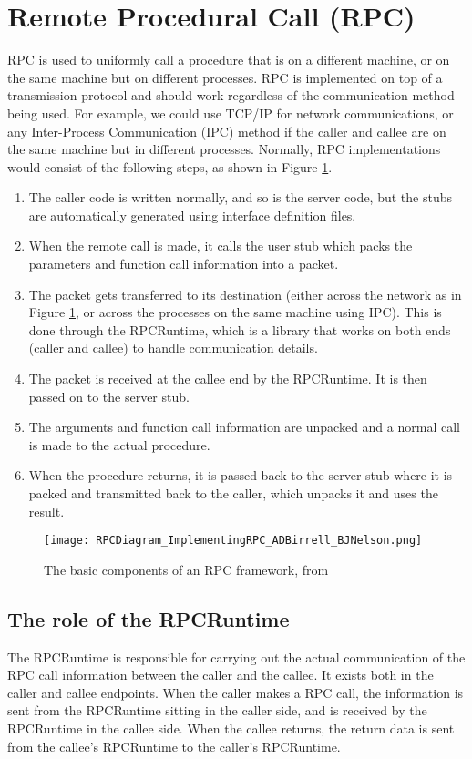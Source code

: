 \section{Remote Procedural Call (RPC)}
\label{RPCBackgroundSection} 
RPC is used to uniformly call a procedure that is on a different machine, or on the same machine but on different processes. RPC is implemented on top of a transmission protocol and should work regardless of the communication method being used. For example, we could use TCP/IP for network communications, or any Inter-Process Communication (IPC) method if the caller and callee are on the same machine but in different processes. Normally, RPC implementations would consist of the following steps, as shown in Figure \ref{fig:rpc-components}.

\begin{enumerate}
  \item The caller code is written normally, and so is the server code, but the stubs are automatically generated using interface definition files.
  \item When the remote call is made, it calls the user stub which packs the parameters and function call information into a packet.
  \item The packet gets transferred to its destination (either across the network as in Figure \ref{fig:rpc-components}, or across the processes on the same machine using IPC). This is done through the RPCRuntime, which is a library that works on both ends (caller and callee) to handle communication details.
  \item The packet is received at the callee end by the RPCRuntime. It is then passed on to the server stub.
  \item The arguments and function call information are unpacked and a normal call is made to the actual procedure.
  \item When the procedure returns, it is passed back to the server stub where it is packed and transmitted back to the caller, which unpacks it and uses the result.
\end{enumerate}

\begin{figure}
    \centering
    \texttt{[image: RPCDiagram\_ImplementingRPC\_ADBirrell\_BJNelson.png]} 
    \caption{The basic components of an RPC framework, from \cite{birrell1984implementing}}
    \label{fig:rpc-components}
\end{figure}

\subsection{The role of the RPCRuntime}
\label{RPCRuntimeBackgroundSection} 
The RPCRuntime is responsible for carrying out the actual communication of the RPC call information between the caller and the callee. It exists both in the caller and callee endpoints. When the caller makes a RPC call, the information is sent from the RPCRuntime sitting in the caller side, and is received by the RPCRuntime in the callee side. When the callee returns, the return data is sent from the callee's RPCRuntime to the caller's RPCRuntime.

